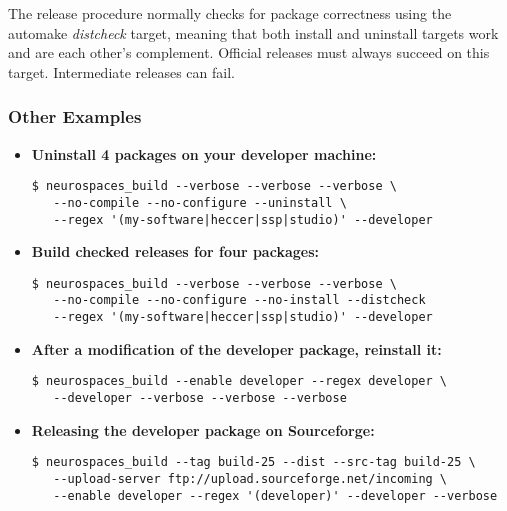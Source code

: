 \documentclass[12pt]{article}
\begin{document}
The release procedure normally checks for package correctness using the automake {\it distcheck} target, meaning that both install and uninstall targets work and are each other's complement. Official releases must always succeed on this target. Intermediate releases can fail.


\subsubsection*{Other Examples}

\begin{itemize}
\item {\bf Uninstall 4 packages on your developer machine:}
\begin{verbatim}
$ neurospaces_build --verbose --verbose --verbose \
   --no-compile --no-configure --uninstall \
   --regex '(my-software|heccer|ssp|studio)' --developer
\end{verbatim}

\item {\bf Build checked releases for four packages:}
\begin{verbatim}
$ neurospaces_build --verbose --verbose --verbose \
   --no-compile --no-configure --no-install --distcheck 
   --regex '(my-software|heccer|ssp|studio)' --developer
\end{verbatim}

\item {\bf After a modification of the developer package, reinstall it:}
\begin{verbatim}
$ neurospaces_build --enable developer --regex developer \
   --developer --verbose --verbose --verbose
\end{verbatim}

\item {\bf Releasing the developer package on Sourceforge:}
\begin{verbatim}
$ neurospaces_build --tag build-25 --dist --src-tag build-25 \
   --upload-server ftp://upload.sourceforge.net/incoming \
   --enable developer --regex '(developer)' --developer --verbose
\end{verbatim}
\end{itemize}
\end{document}
